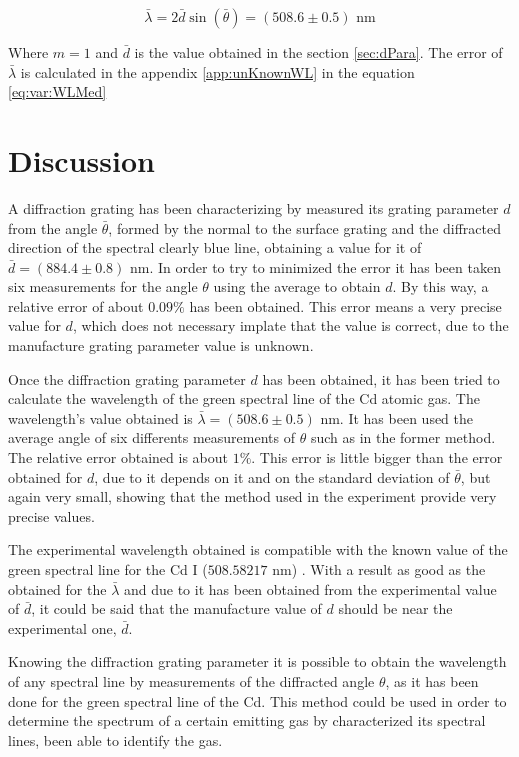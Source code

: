 \documentclass[twoside]{article}
\newcommand{\cl}{clearly blue }
\begin{document}
\begin{multicols}{2}
					\begin{equation}
						\bar{\lambda} = 2 \bar{d} \sin(\bar{\theta}) = (508.6 \pm 0.5) \textrm{ nm}
						\label{eq:WLed}
					\end{equation}

				Where $m=1$ and $\bar{d}$ is the value obtained in the section \ref{sec:dPara}. The error of $\bar{\lambda}$ is calculated in the appendix \ref{app:unKnownWL} in the equation \ref{eq:var:WLMed}

		\section{Discussion}

			A diffraction grating has been characterizing by measured its grating parameter $d$ from the angle $\bar{\theta}$, formed by the normal to the surface grating and the diffracted direction of the spectral \cl line, obtaining a value for it of $\bar{d} = (884.4 \pm 0.8)$ nm. In order to try to minimized the error it has been taken six measurements for the angle $\theta$ using the average to obtain $d$. By this way, a relative error of about $ 0.09 \%$ has been obtained. This error means a very precise value for $d$, which does not necessary implate that the value is correct, due to the manufacture grating parameter value is unknown.

			Once the diffraction grating parameter $d$ has been obtained, it has been tried to calculate the wavelength of the green spectral line of the Cd atomic gas. The wavelength's value obtained is $\bar{\lambda} = (508.6 \pm 0.5) $ nm. It has been used the average angle of six differents measurements of $\theta$ such as in the former method. The relative error obtained is about $1\%$. This error is little bigger than the error obtained for $d$, due to it depends on it and on the standard deviation of $\bar{\theta}$, but again very small, showing that the method used in the experiment provide very precise values. 

			The experimental wavelength obtained is compatible with the known value of the green spectral line for the Cd I ($508.58217$ nm) \cite{NIST_ASD}. With a result as good as the obtained for the $\bar{\lambda}$ and due to it has been obtained from the experimental value of $\bar{d}$, it could be said that the manufacture value of $d$ should be near the experimental one, $\bar{d}$.

			Knowing the diffraction grating parameter it is possible to obtain the wavelength of any spectral line by measurements of the diffracted angle $\theta$, as it has been done for the green spectral line of the Cd. This method could be used in order to determine the spectrum of a certain emitting gas by characterized its spectral lines, been able to identify the gas. 


\end{multicols}
\end{document}
